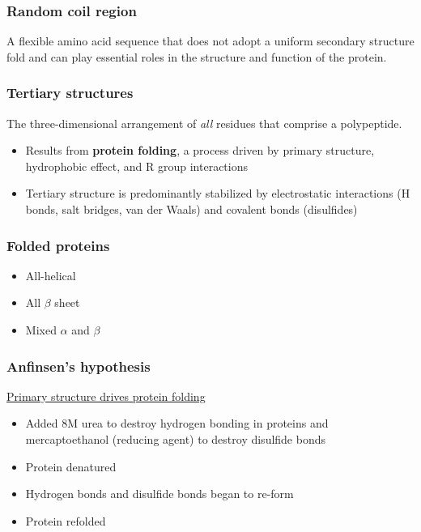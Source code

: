 \documentclass[letterpaper, 12pt]{article}
\begin{document}
\subsubsection*{Random coil region}
A flexible amino acid sequence that does not adopt a uniform secondary structure fold and can play essential roles in the structure and function of the protein.

\subsubsection*{Tertiary structures}
The three-dimensional arrangement of \textit{all} residues that comprise a polypeptide. 

\begin{itemize}
\item Results from \textbf{protein folding}, a process driven by primary structure, hydrophobic effect, and R group interactions
\item Tertiary structure is predominantly stabilized by electrostatic interactions (H bonds, salt bridges, van der Waals) and covalent bonds (disulfides)
\end{itemize}

\subsubsection*{Folded proteins}
\begin{itemize}
\item All-helical
\item All $\beta$ sheet
\item Mixed $\alpha$ and $\beta$
\end{itemize}

\subsubsection*{Anfinsen's hypothesis}
\underline{Primary structure drives protein folding}

\begin{itemize}
\item Added 8M urea to destroy hydrogen bonding in proteins and mercaptoethanol (reducing agent) to destroy disulfide bonds
\item Protein denatured
\item Hydrogen bonds and disulfide bonds began to re-form
\item Protein refolded
\end{itemize}
\end{document}
